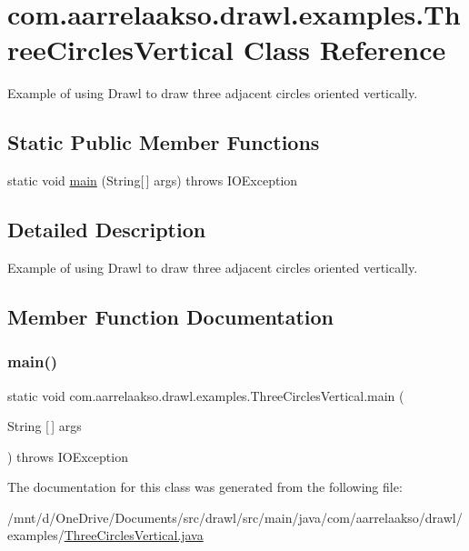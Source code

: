 \hypertarget{classcom_1_1aarrelaakso_1_1drawl_1_1examples_1_1_three_circles_vertical}{}\section{com.\+aarrelaakso.\+drawl.\+examples.\+Three\+Circles\+Vertical Class Reference}
\label{classcom_1_1aarrelaakso_1_1drawl_1_1examples_1_1_three_circles_vertical}


Example of using Drawl to draw three adjacent circles oriented vertically.  


\subsection*{Static Public Member Functions}
\begin{DoxyCompactItemize}
\item 
static void \hyperlink{classcom_1_1aarrelaakso_1_1drawl_1_1examples_1_1_three_circles_vertical_a5b7bb6e28019bcb3a74ce6178ee667fd}{main} (String\mbox{[}$\,$\mbox{]} args)  throws I\+O\+Exception 
\end{DoxyCompactItemize}


\subsection{Detailed Description}
Example of using Drawl to draw three adjacent circles oriented vertically. 

\subsection{Member Function Documentation}
\mbox{\label{classcom_1_1aarrelaakso_1_1drawl_1_1examples_1_1_three_circles_vertical_a5b7bb6e28019bcb3a74ce6178ee667fd}} 
\subsubsection{\texorpdfstring{main()}{main()}}
{\footnotesize\ttfamily static void com.\+aarrelaakso.\+drawl.\+examples.\+Three\+Circles\+Vertical.\+main (\begin{DoxyParamCaption}\item[{String \mbox{[}$\,$\mbox{]}}]{args }\end{DoxyParamCaption}) throws I\+O\+Exception\hspace{0.3cm}{\ttfamily [static]}}



The documentation for this class was generated from the following file\+:\begin{DoxyCompactItemize}
\item 
/mnt/d/\+One\+Drive/\+Documents/src/drawl/src/main/java/com/aarrelaakso/drawl/examples/\hyperlink{_three_circles_vertical_8java}{Three\+Circles\+Vertical.\+java}\end{DoxyCompactItemize}
